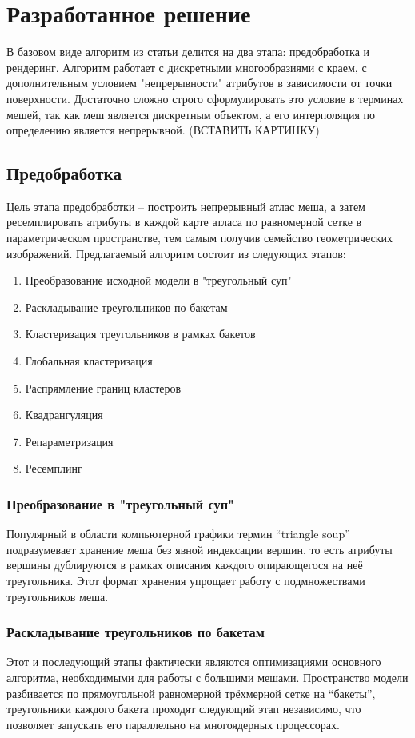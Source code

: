 \documentclass{article}
\begin{document}
\section{Разработанное решение}
\label{sec:algorithm}

В базовом виде алгоритм из статьи \cite{niski2007multi} делится на два этапа: предобработка и рендеринг. Алгоритм работает с дискретными многообразиями с краем, с дополнительным условием "непрерывности" атрибутов в зависимости от точки поверхности. Достаточно сложно строго сформулировать это условие в терминах мешей, так как меш является дискретным объектом, а его интерполяция по определению является непрерывной. (ВСТАВИТЬ КАРТИНКУ)

\subsection{Предобработка}
Цель этапа предобработки -- построить непрерывный атлас меша, а затем ресемплировать атрибуты в каждой карте атласа по равномерной сетке в параметрическом пространстве, тем самым получив семейство геометрических изображений. Предлагаемый алгоритм состоит из следующих этапов:
\begin{enumerate}
\item Преобразование исходной модели в "треугольный суп"
\item Раскладывание треугольников по бакетам
\item Кластеризация треугольников в рамках бакетов
\item Глобальная кластеризация
\item Распрямление границ кластеров
\item Квадрангуляция
\item Репараметризация
\item Ресемплинг
\end{enumerate}

\subsubsection{Преобразование в "треугольный суп"}
Популярный в области компьютерной графики термин ``triangle soup'' подразумевает хранение меша без явной индексации вершин, то есть атрибуты вершины дублируются в рамках описания каждого опирающегося на неё треугольника. Этот формат хранения упрощает работу с подмножествами треугольников меша.

\subsubsection{Раскладывание треугольников по бакетам}
Этот и последующий этапы фактически являются оптимизациями основного алгоритма, необходимыми для работы с большими мешами. Пространство модели разбивается по прямоугольной равномерной трёхмерной сетке на ``бакеты'', треугольники каждого бакета проходят следующий этап независимо, что позволяет запускать его параллельно на многоядерных процессорах.
\end{document}
